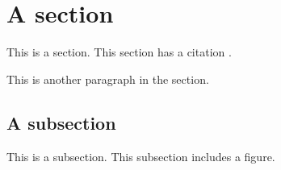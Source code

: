 \section{A section}

This is a section. This section has a citation \parencite{kopka99}.

This is another paragraph in the section.

\subsection{A subsection}

This is a subsection. This subsection includes a figure.